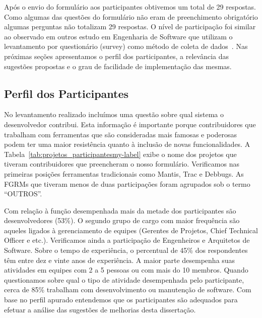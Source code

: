 Após o envio do formulário aos participantes obtivemos um total de 29 respostas.
Como algumas das questões do formulário não eram de preenchimento obrigatório
algumas perguntas não totalizam 29 respostas. O nível de participação foi
similar ao observado em outros estudo em Engenharia de Software que utilizam o
levantamento por questionário (survey) como método de coleta de
dados~\cite{fan2010factors}. Nas próximas seções apresentamos o perfil dos
participantes, a relevância das sugestões propostas e o grau de facilidade de
implementação das mesmas.

\subsection{Perfil dos Participantes}
\label{sub:sug_melhorias_resultados_perfil_dos_participantes}

No levantamento realizado incluímos uma questão sobre qual sistema o
desenvolvedor contribui. Esta informação é importante porque contribuidores que
trabalham com ferramentas que são consideradas mais famosas e poderosas podem
ter uma maior resistência quanto à inclusão de novas funcionalidades. A
Tabela~\ref{tab:projetos_participantesmy-label} exibe o nome dos projetos que
tiveram contribuidores que preencheram o nosso formulário. Verificamos nas
primeiras posições ferramentas tradicionais como Mantis, Trac e Debbugs. As
FGRMs que tiveram menos de duas participações foram agrupados sob o termo
``OUTROS''.

\begin{table}[htpb]
\centering
{}
\caption{Projetos que os participantes contribuem.}
\label{tab:projetos_participantesmy-label}
\end{table}

Com relação à função desempenhada mais da metade dos participantes são
desenvolvedores (53\%). O segundo grupo de cargo com maior frequência são
aqueles ligados à gerenciamento de equipes (Gerentes de Projetos, Chief
Technical Officer e etc.). Verificamos ainda a participação de Engenheiros e
Arquitetos de Software. Sobre o tempo de experiência, o percentual de 45\% dos
respondentes têm entre dez e vinte anos de experiência. A maior parte desempenha
suas atividades em equipes com 2 a 5 pessoas ou com mais do 10 membros. Quando
questionamos sobre qual o tipo de atividade desempenhada pelo participante,
cerca de 85\% trabalham com desenvolvimento ou manutenção de software. Com base
no perfil apurado entendemos que os participantes são adequados para efetuar a
análise das sugestões de melhorias desta dissertação.


